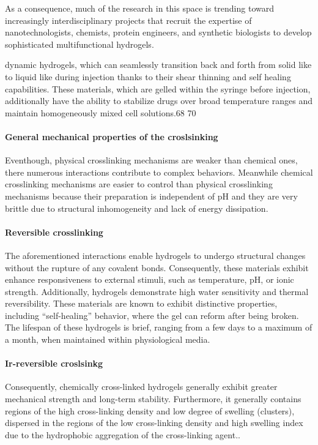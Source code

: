 As a consequence, much of the research in this space is trending toward increasingly interdisciplinary projects that recruit the expertise of nanotechnologists, chemists, protein engineers, and synthetic biologists to develop sophisticated multifunctional hydrogels\citep{correaTranslationalApplicationsHydrogels2021}. 


dynamic hydrogels, which can seamlessly transition back and forth from solid like to liquid like during injection thanks to their shear thinning and self healing capabilities. 
These materials, which are gelled within the syringe before injection, additionally have the ability to stabilize drugs over broad temperature ranges and maintain homogeneously mixed  cell solutions.68 70\citep{correaTranslationalApplicationsHydrogels2021} 



\paragraph{General mechanical properties of the croslsinking}
Eventhough, physical crosslinking mechanisms are weaker than chemical ones, there numerous interactions contribute to complex behaviors.
Meanwhile chemical crosslinking mechanisms are easier to control than physical crosslinking mechanisms because their preparation is independent of pH\citep{bustamantetorresHydrogelsClassificationAccording2021} and they are very brittle due to structural inhomogeneity and lack of energy dissipation\citep{xuRoleChemicalPhysical2018}.


\paragraph{Reversible crosslinking}
The aforementioned interactions enable hydrogels to undergo structural changes without the rupture of any covalent bonds. 
Consequently, these materials exhibit enhance responsiveness to external stimuli, such as temperature, pH, or ionic strength. 
Additionally, hydrogels demonstrate high water sensitivity and thermal reversibility\citep{bustamantetorresHydrogelsClassificationAccording2021,priyaComprehensiveReviewHydrogel2024}.
These materials are known to exhibit distinctive properties, including ``self-healing'' behavior, where the gel can reform after being broken.
The lifespan of these hydrogels is brief, ranging from a few days to a maximum of a month, when maintained within physiological media.


\paragraph{Ir-reversible croslsinkg}
Consequently, chemically cross-linked hydrogels generally exhibit greater mechanical strength and long-term stability.  
Furthermore, it generally contains regions of the high cross-linking density and low degree of swelling (clusters), dispersed in the regions of the low cross-linking density and high swelling index due to the hydrophobic aggregation of the cross-linking agent\citep{bustamantetorresHydrogelsClassificationAccording2021}..


